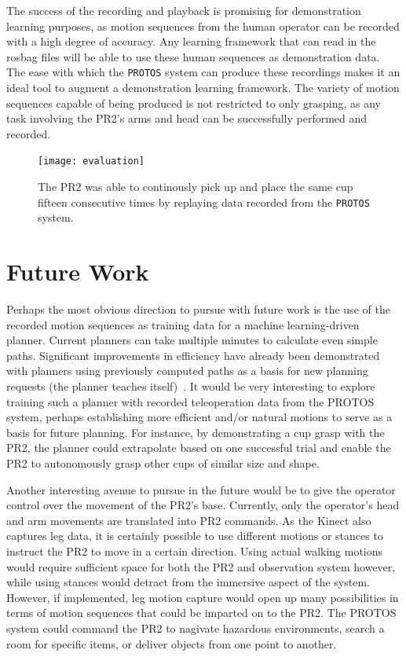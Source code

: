 \documentclass{sig-alternate}
\begin{document}
\indent The success of the recording and playback is promising for demonstration learning purposes, as motion sequences from the
 human operator can be recorded with a high degree of
accuracy. Any learning framework that can read in the rosbag files will be able to use these human sequences as demonstration data. The ease with which the {\tt PROTOS} system can 
produce these recordings makes it an ideal tool to augment a demonstration learning framework. The variety of motion sequences capable of being produced is not restricted
to only grasping, as any task involving the PR2's arms and head can be successfully performed and recorded.

\begin{figure}[htb] 
	\begin{center}
		\texttt{[image: evaluation]}
	\end{center}
	\caption{The PR2 was able to continously pick up and place the same cup fifteen consecutive times by replaying data recorded from the {\tt PROTOS} system.}
	\label{fig:evaluation}
\end{figure}

\section{Future Work}
\label{sec:future_work} Perhaps the most obvious direction to pursue with
future work is the use of the recorded motion sequences as training data
for a machine learning-driven planner. Current planners can take multiple 
minutes to calculate even simple paths. Significant improvements in efficiency have 
already been demonstrated with planners using previously computed paths as a 
basis for new planning requests (the planner teaches itself)~\cite{mit_planning}. It would be
very interesting to explore training such a planner with recorded teleoperation
data from the PROTOS system, perhaps establishing more efficient and/or natural motions to serve as
a basis for future planning. For instance, by demonstrating a cup grasp with the PR2, the planner
could extrapolate based on one successful trial and enable the PR2 to autonomously grasp other cups
of similar size and shape.

\indent Another interesting avenue to pursue in the future would be to give the 
operator control over the movement of the PR2's base. Currently, only
the operator's head and arm movements are translated into PR2 commands. As the
Kinect also captures leg data, it is certainly possible to use different
motions or stances to instruct the PR2 to move in a certain direction.
Using actual walking motions would require sufficient space for both the PR2
and observation system however, while 
using stances would detract from the immersive aspect of the system. However,
if implemented, leg motion capture would open up many possibilities in terms of
motion sequences that could be imparted on to the PR2. The PROTOS system could 
command the PR2 to
nagivate hazardous environments, search a room for specific items, or deliver
objects from one point to another.
\end{document}
